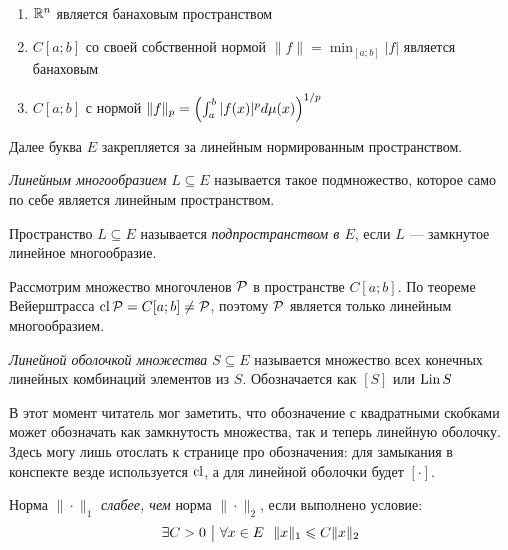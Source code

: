 \begin{example}~
	\begin{enumerate}
		\item $\mathbb{R}^n$ является банаховым пространством
		
		\item $C[a; b]$ со своей собственной нормой $\|f\| = \min_{[a; b]} |f|$ является банаховым
		
		\item $C[a; b]$ с нормой $\|f\|_p = \left(\int_a^b |f(x)|^pd\mu(x)\right)^{1 / p}$
	\end{enumerate}
\end{example}

\begin{note}
	Далее буква $E$ закрепляется за линейным нормированным пространством. 
\end{note}

\begin{definition}
	\textit{Линейным многообразием} $L \subseteq E$ называется такое подмножество, которое само по себе является линейным пространством.
\end{definition}

\begin{definition}
	Пространство $L \subseteq E$ называется \textit{подпространством в $E$}, если $L$ --- замкнутое линейное многообразие.
\end{definition}

\begin{example}
	Рассмотрим множество многочленов $\mathcal{P}$ в пространстве $C[a; b]$. По теореме Вейерштрасса $\operatorname{cl} \mathcal{P} = C[a; b] \neq \mathcal{P}$, поэтому $\mathcal{P}$ является только линейным многообразием.
\end{example}

\begin{definition}
	\textit{Линейной оболочкой множества} $S \subseteq E$ называется множество всех конечных линейных комбинаций элементов из $S$. Обозначается как $[S]$ или $\operatorname{Lin} S$
\end{definition}

\begin{anote}
	В этот момент читатель мог заметить, что обозначение с квадратными скобками может обозначать как замкнутость множества, так и теперь линейную оболочку. Здесь могу лишь отослать к странице про обозначения: для замыкания в конспекте везде используется $\operatorname{cl}$, а для линейной оболочки будет $[\cdot]$.
\end{anote}

\begin{definition}
	Норма $\|\cdot\|_1$ \textit{слабее, чем} норма $\|\cdot\|_2$, если выполнено условие:
	\[
		\exists C > 0 \ \big|\  \forall x \in E\ \ \|x\|_1 \leqslant C\|x\|_2
	\]
\end{definition}

